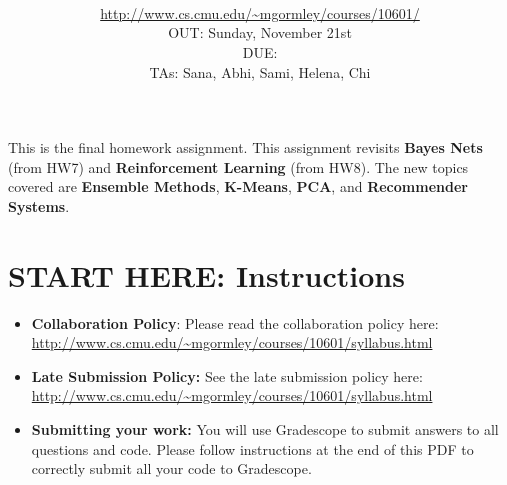 \documentclass[11pt,addpoints,answers]{exam}
\title{\textsc{\hwName}
} %
\author{\courseName\\
\url{http://www.cs.cmu.edu/~mgormley/courses/10601/} \\
OUT: Sunday, November 21st \\
DUE: \dueDate{} \\ 
TAs: Sana, Abhi, Sami, Helena, Chi
}
\date{}
\date{}
\begin{document}
\maketitle

\begin{notebox}
This is the final homework assignment. This assignment revisits \textbf{Bayes Nets} (from HW7) and \textbf{Reinforcement Learning} (from HW8). The new topics covered are \textbf{Ensemble Methods}, \textbf{K-Means}, \textbf{PCA}, and \textbf{Recommender Systems}.
\end{notebox}
\newcommand \maxsubs {10 }
\section*{START HERE: Instructions}
\begin{itemize}

\item \textbf{Collaboration Policy}: Please read the collaboration policy here: \url{http://www.cs.cmu.edu/~mgormley/courses/10601/syllabus.html}

\item\textbf{Late Submission Policy:} See the late submission policy here: \url{http://www.cs.cmu.edu/~mgormley/courses/10601/syllabus.html}

\item\textbf{Submitting your work:} You will use Gradescope to submit
  answers to all questions and code. Please
  follow instructions at the end of this PDF to correctly submit all your code to Gradescope.

  \begin{itemize}
    

    

\end{itemize}
\end{itemize}
\end{document}
